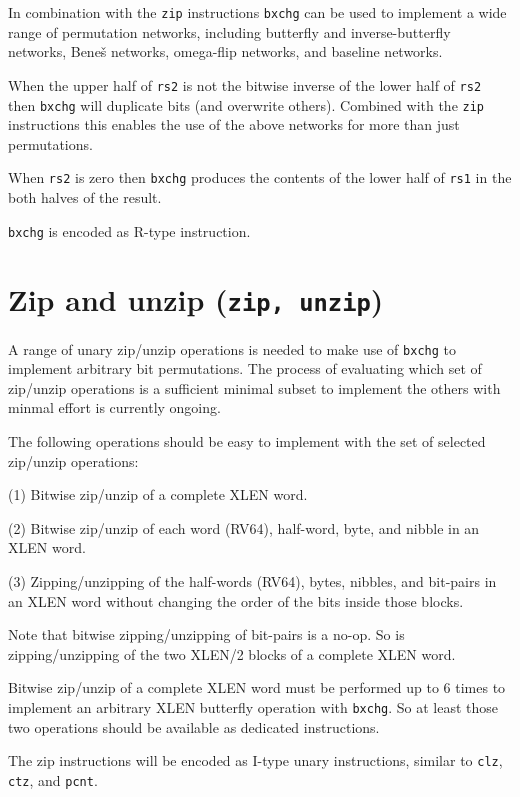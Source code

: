 In combination with the {\tt zip} instructions \texttt{bxchg} can be used to
implement a wide range of permutation networks, including butterfly and
inverse-butterfly networks, Bene{\v s} networks, omega-flip networks, and
baseline networks.

When the upper half of {\tt rs2} is not the bitwise inverse of the lower half
of {\tt rs2} then \texttt{bxchg} will duplicate bits (and overwrite others).
Combined with the {\tt zip} instructions this enables the use of the above networks
for more than just permutations.

When {\tt rs2} is zero then \texttt{bxchg} produces the contents of the lower
half of {\tt rs1} in the both halves of the result.

\texttt{bxchg} is encoded as R-type instruction.


\section{Zip and unzip (\texttt{zip,\ unzip})}

A range of unary zip/unzip operations is needed to make use of \texttt{bxchg} to implement
arbitrary bit permutations. The process of evaluating which set of zip/unzip operations
is a sufficient minimal subset to implement the others with minmal effort is currently ongoing.

The following operations should be easy to implement with the set of selected
zip/unzip operations:

(1) Bitwise zip/unzip of a complete XLEN word.

(2) Bitwise zip/unzip of each word (RV64), half-word, byte, and nibble in an XLEN word.

(3) Zipping/unzipping of the half-words (RV64), bytes, nibbles, and bit-pairs
in an XLEN word without changing the order of the bits inside those blocks.

Note that bitwise zipping/unzipping of bit-pairs is a no-op. So is zipping/unzipping of
the two XLEN/2 blocks of a complete XLEN word.

Bitwise zip/unzip of a complete XLEN word must be performed up to 6 times to
implement an arbitrary XLEN butterfly operation with \texttt{bxchg}. So at least
those two operations should be available as dedicated instructions.

The zip instructions will be encoded as I-type unary instructions, similar to {\tt clz},
{\tt ctz}, and {\tt pcnt}.
